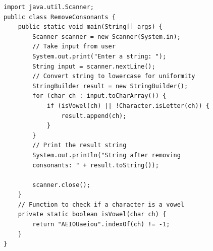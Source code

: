 \begin{verbatim}
import java.util.Scanner;
public class RemoveConsonants {
    public static void main(String[] args) {
        Scanner scanner = new Scanner(System.in);
        // Take input from user
        System.out.print("Enter a string: ");
        String input = scanner.nextLine();
        // Convert string to lowercase for uniformity
        StringBuilder result = new StringBuilder();
        for (char ch : input.toCharArray()) {
            if (isVowel(ch) || !Character.isLetter(ch)) {
                result.append(ch);
            }
        }
        // Print the result string
        System.out.println("String after removing 
        consonants: " + result.toString());

        scanner.close();
    }
    // Function to check if a character is a vowel
    private static boolean isVowel(char ch) {
        return "AEIOUaeiou".indexOf(ch) != -1;
    }
}
\end{verbatim}